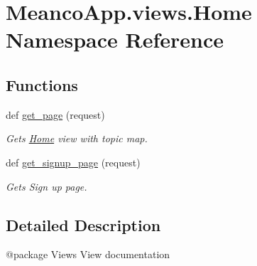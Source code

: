 \hypertarget{namespace_meanco_app_1_1views_1_1_home}{}\section{Meanco\+App.\+views.\+Home Namespace Reference}
\label{namespace_meanco_app_1_1views_1_1_home}
\subsection*{Functions}
\begin{DoxyCompactItemize}
\item 
\hypertarget{namespace_meanco_app_1_1views_1_1_home_ade3ec0dc965f74473dc0acb530a6250d}{}\label{namespace_meanco_app_1_1views_1_1_home_ade3ec0dc965f74473dc0acb530a6250d} 
def \hyperlink{namespace_meanco_app_1_1views_1_1_home_ade3ec0dc965f74473dc0acb530a6250d}{get\+\_\+page} (request)
\begin{DoxyCompactList}\small\item\em Gets \hyperlink{namespace_meanco_app_1_1views_1_1_home}{Home} view with topic map. \end{DoxyCompactList}\item 
\hypertarget{namespace_meanco_app_1_1views_1_1_home_a3011ef99af8b83d5034f11ed1df4fe1d}{}\label{namespace_meanco_app_1_1views_1_1_home_a3011ef99af8b83d5034f11ed1df4fe1d} 
def \hyperlink{namespace_meanco_app_1_1views_1_1_home_a3011ef99af8b83d5034f11ed1df4fe1d}{get\+\_\+signup\+\_\+page} (request)
\begin{DoxyCompactList}\small\item\em Gets Sign up page. \end{DoxyCompactList}\end{DoxyCompactItemize}


\subsection{Detailed Description}
\begin{DoxyVerb}@package Views
View documentation\end{DoxyVerb}
 